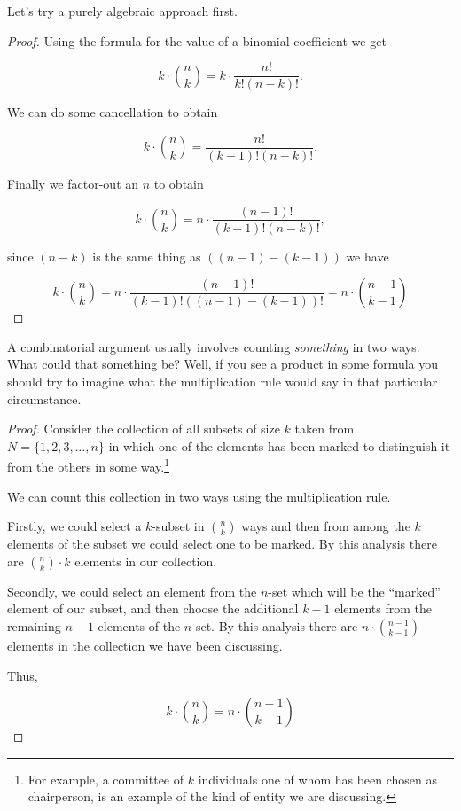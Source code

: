 Let's try a purely algebraic approach first.

\begin{proof}

Using the formula for the value of a binomial coefficient 
we get 

\[ k \cdot \binom{n}{k} = k \cdot \frac{n!}{k! (n-k)!}. \]

We can do some cancellation to obtain

\[ k \cdot \binom{n}{k} = \frac{n!}{(k-1)! (n-k)!}. \]

Finally we factor-out an $n$ to obtain

\[ k \cdot \binom{n}{k} = n \cdot \frac{(n-1)!}{(k-1)! (n-k)!}, \]

\noindent since $(n-k)$ is the same thing as $((n-1)-(k-1))$ we have

\[ k \cdot \binom{n}{k} = n \cdot \frac{(n-1)!}{(k-1)!((n-1)-(k-1))!} 
= n \cdot \binom{n-1}{k-1} \]

\end{proof}

A combinatorial argument usually involves counting \emph{something} 
in two ways.  What could that something be?  Well, if you see a 
product in some formula you should try to imagine what the 
multiplication rule would say in that particular circumstance.

\begin{proof} 
Consider the collection of all subsets of size $k$ taken from 
$N = \{1, 2, 3, \ldots, n\}$ in which one of the elements has
been marked to distinguish it from the others in some way.\footnote{
For example, a committee of $k$ individuals one of whom has been %
chosen as chairperson, is an example of the kind of entity we are %
discussing.}

We can count this collection in two ways using the multiplication rule.

Firstly, we could select a $k$-subset in $\binom{n}{k}$ ways and then from
among the $k$ elements of the subset we could select one to be marked.
By this analysis there are $\binom{n}{k} \cdot k$ elements in our
collection.

Secondly, we could select an element from the $n$-set which will be 
the ``marked'' element of our subset, and then choose the additional
$k-1$ elements from the remaining $n-1$ elements of the $n$-set.
By this analysis there are $n \cdot \binom{n-1}{k-1}$ elements in
the collection we have been discussing.

Thus,

\[ k \cdot \binom{n}{k} = n \cdot \binom{n-1}{k-1} \]

\end{proof}

